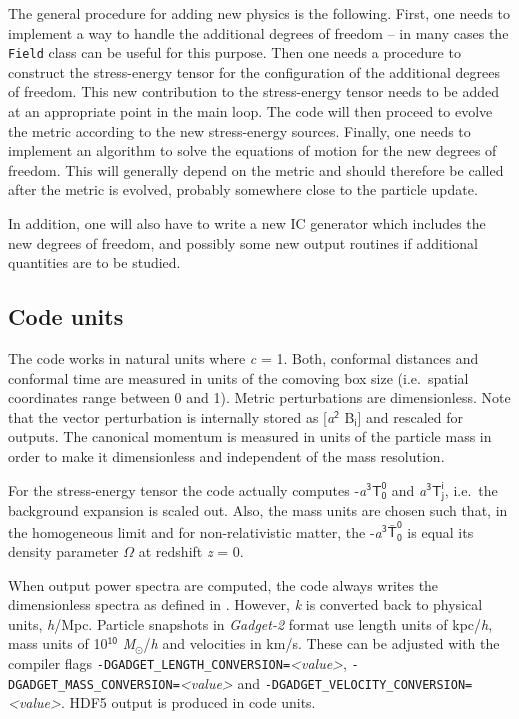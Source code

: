 \documentclass[a4paper,10pt]{article}
\begin{document}
\noindent The general procedure for adding new physics is the following. First, one needs to implement a way to handle the additional
degrees of freedom -- in many cases the \texttt{Field} class can be useful for this purpose. Then one needs a procedure to construct the
stress-energy tensor for the configuration of the additional degrees of freedom. This new contribution to the stress-energy tensor needs to
be added at an appropriate point in the main loop. The code will then proceed to evolve the metric according to the new stress-energy
sources. Finally, one needs to implement an algorithm to solve the equations of motion for the new degrees of freedom. This will generally
depend on the metric and should therefore be called after the metric is evolved, probably somewhere close to the particle update.

In addition, one will also have to write a new IC generator which includes the new degrees of freedom, and possibly some new output routines
if additional quantities are to be studied.

\subsection{Code units}
\label{sec:units}

The code works in natural units where \textit{c} = 1. Both, conformal distances and conformal time are measured in units of the comoving box
size (i.e.\ spatial coordinates range between 0 and 1). Metric perturbations are dimensionless. Note that the vector perturbation is internally
stored as [\textit{a}$^\mathsf{2}$ B$_\mathsf{i}$] and rescaled for outputs. The canonical momentum is measured in units
of the particle mass in order to make it dimensionless and independent of the mass resolution.

For the stress-energy tensor the code actually computes -\textit{a}$^\mathsf{3} \mathsf{T^0_0}$ and \textit{a}$^\mathsf{3} \mathsf{T^i_j}$,
i.e.\ the background expansion is scaled out. Also, the mass units are chosen such that, in the homogeneous limit and for non-relativistic
matter, the -\textit{a}$^\mathsf{3}\mathsf{\bar{T}^0_0}$ is equal its density parameter $\mathsf{\Omega}$ at redshift \textit{z} = 0.

When output power spectra are computed, the code always writes the dimensionless spectra as defined in \cite{Adamek:2015eda}. However,
\textit{k} is converted back to physical units, \textit{h}/Mpc. Particle snapshots in \textit{Gadget-2} format use length units of
kpc/\textit{h}, mass units of 10$^\mathsf{10}$ \textit{M}$_\odot$/\textit{h} and velocities in km/s. These can be adjusted with the compiler
flags \texttt{-DGADGET\_LENGTH\_CONVERSION=}\textit{<value>}, \texttt{-DGADGET\_MASS\_CONVERSION=}\textit{<value>} and
\texttt{-DGADGET\_VELOCITY\_CONVERSION=}\textit{<value>}. HDF5 output is produced in code units.
\end{document}

